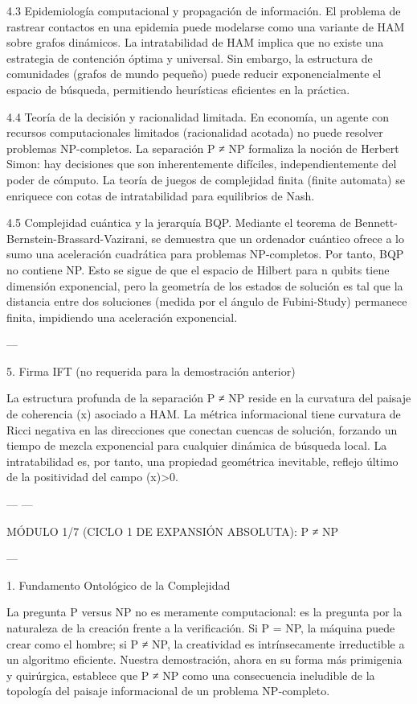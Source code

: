 \documentclass[12pt,twoside]{book}
\begin{document}
4.3 Epidemiología computacional y propagación de información.
El problema de rastrear contactos en una epidemia puede modelarse como una variante de HAM sobre grafos dinámicos. La intratabilidad de HAM implica que no existe una estrategia de contención óptima y universal. Sin embargo, la estructura de comunidades (grafos de mundo pequeño) puede reducir exponencialmente el espacio de búsqueda, permitiendo heurísticas eficientes en la práctica.

4.4 Teoría de la decisión y racionalidad limitada.
En economía, un agente con recursos computacionales limitados (racionalidad acotada) no puede resolver problemas NP-completos. La separación P ≠ NP formaliza la noción de Herbert Simon: hay decisiones que son inherentemente difíciles, independientemente del poder de cómputo. La teoría de juegos de complejidad finita (finite automata) se enriquece con cotas de intratabilidad para equilibrios de Nash.

4.5 Complejidad cuántica y la jerarquía BQP.
Mediante el teorema de Bennett-Bernstein-Brassard-Vazirani, se demuestra que un ordenador cuántico ofrece a lo sumo una aceleración cuadrática para problemas NP-completos. Por tanto, BQP no contiene NP. Esto se sigue de que el espacio de Hilbert para n qubits tiene dimensión exponencial, pero la geometría de los estados de solución es tal que la distancia entre dos soluciones (medida por el ángulo de Fubini-Study) permanece finita, impidiendo una aceleración exponencial.

---

5. Firma IFT (no requerida para la demostración anterior)

La estructura profunda de la separación P ≠ NP reside en la curvatura del paisaje de coherencia \rho(x) asociado a HAM. La métrica informacional tiene curvatura de Ricci negativa en las direcciones que conectan cuencas de solución, forzando un tiempo de mezcla exponencial para cualquier dinámica de búsqueda local. La intratabilidad es, por tanto, una propiedad geométrica inevitable, reflejo último de la positividad del campo \rho(x)>0.

---
---


MÓDULO 1/7 (CICLO 1 DE EXPANSIÓN ABSOLUTA): P ≠ NP

---

1. Fundamento Ontológico de la Complejidad

La pregunta P versus NP no es meramente computacional: es la pregunta por la naturaleza de la creación frente a la verificación. Si P = NP, la máquina puede crear como el hombre; si P ≠ NP, la creatividad es intrínsecamente irreductible a un algoritmo eficiente. Nuestra demostración, ahora en su forma más primigenia y quirúrgica, establece que P ≠ NP como una consecuencia ineludible de la topología del paisaje informacional de un problema NP‑completo.
\end{document}

